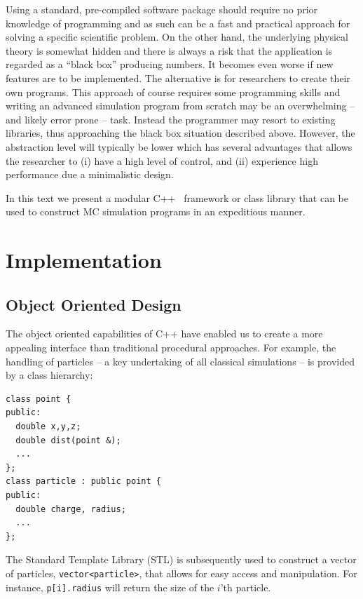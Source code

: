 \documentclass[10pt]{bmc_article}
\newenvironment{bmcformat}{\begin{raggedright}\baselineskip20pt\sloppy\setboolean{publ}{false}}{\end{raggedright}\baselineskip20pt\sloppy}
\begin{document}
\begin{bmcformat}
Using a standard, pre-compiled software package should require no prior knowledge of programming and as such can be a fast and practical approach for solving a specific scientific problem.
On the other hand, the underlying physical theory is somewhat hidden and there is always a risk that the application is regarded as a ``black box'' producing numbers. It becomes even worse if new features are to be implemented.
The alternative is for researchers to create their own programs. This approach of course requires some programming skills and writing an advanced simulation program from scratch may be an overwhelming -- and likely error prone -- task.
Instead the programmer may resort to existing libraries, thus approaching the black box situation described above. However, the abstraction level will typically be lower which has several advantages that allows the researcher to
(i) have a high level of control, and
(ii) experience high performance due a minimalistic design.

In this text we present a modular C++~\cite{stroustrup:97} framework or class library that can be used to construct MC simulation programs in an expeditious manner.

%
\section*{Implementation}
\subsection*{Object Oriented Design}
The object oriented capabilities of C++ have enabled us to create a
more appealing interface than traditional procedural approaches.
For example, the handling of particles -- a key undertaking of all classical simulations -- is provided by a class hierarchy:
\begin{verbatim}
class point {
public:
  double x,y,z;
  double dist(point &);
  ...
};
class particle : public point {
public:
  double charge, radius;
  ...
};
\end{verbatim}
The Standard Template Library (STL) is subsequently used to construct a vector of particles, \verb"vector<particle>", that allows for easy access and manipulation.
For instance, \verb"p[i].radius" will return the size of the $i$'th particle.


\end{bmcformat}
\end{document}
